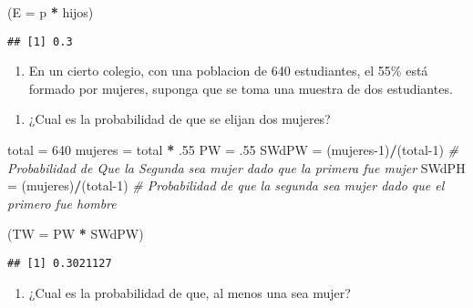 \documentclass[
]{article}
\newenvironment{Shaded}{\begin{snugshade}}{\end{snugshade}}
\newcommand{\AttributeTok}[1]{\textcolor[rgb]{0.13,0.29,0.53}{#1}}
\newcommand{\CommentTok}[1]{\textcolor[rgb]{0.56,0.35,0.01}{\textit{#1}}}
\newcommand{\DecValTok}[1]{\textcolor[rgb]{0.00,0.00,0.81}{#1}}
\newcommand{\NormalTok}[1]{#1}
\newcommand{\OtherTok}[1]{\textcolor[rgb]{0.56,0.35,0.01}{#1}}
\newcommand{\SpecialCharTok}[1]{\textcolor[rgb]{0.81,0.36,0.00}{\textbf{#1}}}
\providecommand{\tightlist}{%
  \setlength{\itemsep}{0pt}\setlength{\parskip}{0pt}}
\begin{document}
\begin{Shaded}
\begin{Highlighting}[]
\NormalTok{(}\AttributeTok{E =}\NormalTok{ p }\SpecialCharTok{*}\NormalTok{ hijos)}
\end{Highlighting}
\end{Shaded}

\begin{verbatim}
## [1] 0.3
\end{verbatim}

\begin{enumerate}
\def\labelenumi{\arabic{enumi}.}
\setcounter{enumi}{1}
\tightlist
\item
  En un cierto colegio, con una poblacion de 640 estudiantes, el 55\%
  está formado por mujeres, suponga que se toma una muestra de dos
  estudiantes.
\end{enumerate}

\begin{enumerate}
\def\labelenumi{\alph{enumi})}
\tightlist
\item
  ¿Cual es la probabilidad de que se elijan dos mujeres?
\end{enumerate}

\begin{Shaded}
\begin{Highlighting}[]
\NormalTok{total }\OtherTok{=} \DecValTok{640}
\NormalTok{mujeres }\OtherTok{=}\NormalTok{ total }\SpecialCharTok{*}\NormalTok{ .}\DecValTok{55}
\NormalTok{PW }\OtherTok{=}\NormalTok{ .}\DecValTok{55}
\NormalTok{SWdPW }\OtherTok{=}\NormalTok{ (mujeres}\DecValTok{{-}1}\NormalTok{)}\SpecialCharTok{/}\NormalTok{(total}\DecValTok{{-}1}\NormalTok{) }\CommentTok{\# Probabilidad de Que la Segunda sea mujer dado que la primera fue mujer}
\NormalTok{SWdPH }\OtherTok{=}\NormalTok{ (mujeres)}\SpecialCharTok{/}\NormalTok{(total}\DecValTok{{-}1}\NormalTok{) }\CommentTok{\# Probabilidad de que la segunda sea mujer dado que el primero fue hombre}

\NormalTok{(}\AttributeTok{TW =}\NormalTok{ PW }\SpecialCharTok{*}\NormalTok{ SWdPW)}
\end{Highlighting}
\end{Shaded}

\begin{verbatim}
## [1] 0.3021127
\end{verbatim}

\begin{enumerate}
\def\labelenumi{\alph{enumi})}
\setcounter{enumi}{1}
\tightlist
\item
  ¿Cual es la probabilidad de que, al menos una sea mujer?
\end{enumerate}
\end{document}
